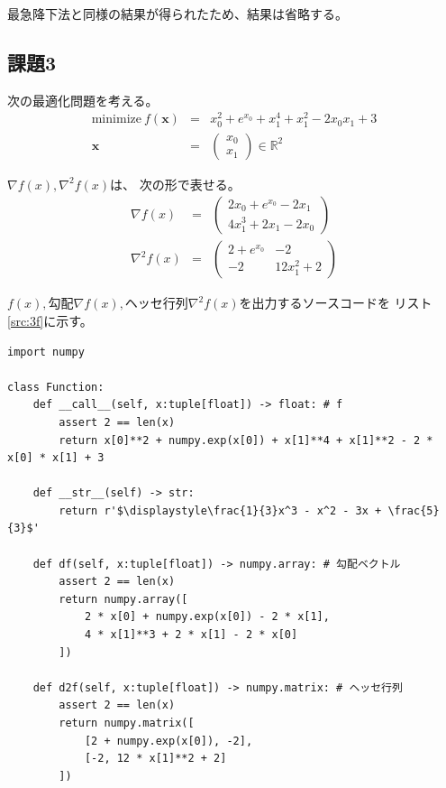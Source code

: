 \documentclass[a4j, titlepage]{jsarticle}
\numberwithin{equation}{section}
\begin{document}
            最急降下法と同様の結果が得られたため、結果は省略する。

    \subsection{課題3} \label{sec:kadai3}
        次の最適化問題を考える。
        \begin{eqnarray*}
            \mathrm{minimize} \ f(\bm{x}) &=& x_0^2 + e^{x_0} + x_1^4 + x_1^2 -2x_0x_1 + 3 \\
            \bm{x} &=& \begin{pmatrix}
                x_0 \\
                x_1
            \end{pmatrix} \in \mathbb{R}^2
        \end{eqnarray*}

        $\nabla f(x), \nabla^2f(x)$は、
        次の形で表せる。
        \begin{eqnarray*}
            \nabla f(x) &=& \begin{pmatrix}
                2x_0 + e^{x_0} - 2x_1 \\
                4x_1^3 + 2x_1 - 2x_0
            \end{pmatrix} \\
            \nabla^2f(x) &=& \begin{pmatrix}
                2 + e^{x_0} & -2 \\
                -2 & 12x_1^2+2
            \end{pmatrix}
        \end{eqnarray*}

        $f(x), 勾配\nabla f(x), ヘッセ行列\nabla^2f(x)$を出力するソースコードを
        リスト\ref{src:3f}に示す。

        \begin{lstlisting}[caption={$f, \nabla f, \nabla^2f$の実装}, label=src:3f]
import numpy

class Function:
    def __call__(self, x:tuple[float]) -> float: # f
        assert 2 == len(x)
        return x[0]**2 + numpy.exp(x[0]) + x[1]**4 + x[1]**2 - 2 * x[0] * x[1] + 3
    
    def __str__(self) -> str:
        return r'$\displaystyle\frac{1}{3}x^3 - x^2 - 3x + \frac{5}{3}$'
    
    def df(self, x:tuple[float]) -> numpy.array: # 勾配ベクトル
        assert 2 == len(x)
        return numpy.array([
            2 * x[0] + numpy.exp(x[0]) - 2 * x[1],
            4 * x[1]**3 + 2 * x[1] - 2 * x[0]
        ])
    
    def d2f(self, x:tuple[float]) -> numpy.matrix: # ヘッセ行列
        assert 2 == len(x)
        return numpy.matrix([
            [2 + numpy.exp(x[0]), -2],
            [-2, 12 * x[1]**2 + 2]
        ])
        \end{lstlisting}
\end{document}
